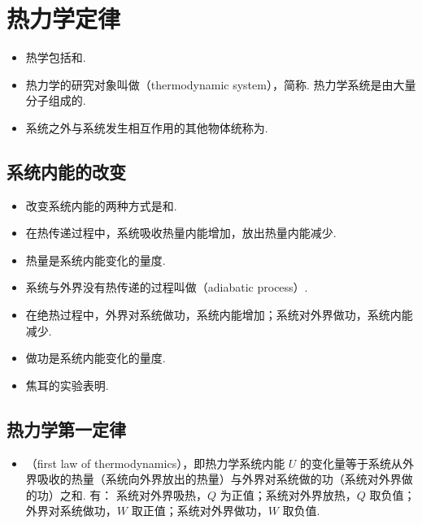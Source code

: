 \section{热力学定律}

\vspace{10pt}
\begin{itemize}
\item 热学包括和.
\item 热力学的研究对象叫做（thermodynamic system），简称. 热力学系统是由大量分子组成的.
\item 系统之外与系统发生相互作用的其他物体统称为.
\end{itemize}

\subsection{系统内能的改变}
\begin{itemize}
\item 改变系统内能的两种方式是和.
\item 在热传递过程中，系统吸收热量内能增加，放出热量内能减少.
\item 热量是系统内能变化的量度.
\item 系统与外界没有热传递的过程叫做（adiabatic process）.
\item 在绝热过程中，外界对系统做功，系统内能增加；系统对外界做功，系统内能减少.
\item 做功是系统内能变化的量度.
\item 焦耳的实验表明.
\end{itemize}

\subsection{热力学第一定律}
\begin{itemize}
\item {}（first law of thermodynamics），即热力学系统内能 $U$ 的变化量等于系统从外界吸收的热量（系统向外界放出的热量）与外界对系统做的功（系统对外界做的功）之和. 有：
系统对外界吸热，$Q$ 为正值；系统对外界放热，$Q$ 取负值；外界对系统做功，$W$ 取正值；系统对外界做功，$W$ 取负值.
\end{itemize}

